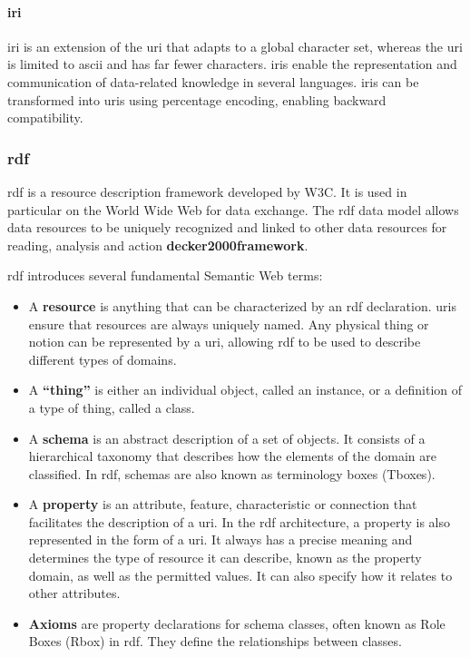         
        \paragraph{\acrfull{iri}}
        \acrshort{iri} is an extension of the \acrshort{uri} that adapts to a global character set, whereas the \acrshort{uri} is limited to \acrshort{ascii} and has far fewer characters. \acrshort{iri}s enable the representation and communication of data-related knowledge in several languages. \acrshort{iri}s can be transformed into \acrshort{uri}s using percentage encoding, enabling backward compatibility.


    \subsubsection{\acrfull{rdf}}
    \acrshort{rdf} is a resource description framework developed by W3C. It is used in particular on the World Wide Web for data exchange. The \acrshort{rdf} data model allows data resources to be uniquely recognized and linked to other data resources for reading, analysis and action \textbf{decker2000framework}. 

    \acrshort{rdf} introduces several fundamental Semantic Web terms:

    \begin{itemize}
        \item A \textbf{resource} is anything that can be characterized by an \acrshort{rdf} declaration. \acrshort{uri}s ensure that resources are always uniquely named. Any physical thing or notion can be represented by a \acrshort{uri}, allowing \acrshort{rdf} to be used to describe different types of domains.
        \item A \textbf{“thing”} is either an individual object, called an instance, or a definition of a type of thing, called a class. 
        \item A \textbf{schema} is an abstract description of a set of objects. It consists of a hierarchical taxonomy that describes how the elements of the domain are classified. In \acrshort{rdf}, schemas are also known as terminology boxes (Tboxes). 
        \item A \textbf{property} is an attribute, feature, characteristic or connection that facilitates the description of a \acrshort{uri}. In the \acrshort{rdf} architecture, a property is also represented in the form of a \acrshort{uri}. It always has a precise meaning and determines the type of resource it can describe, known as the property domain, as well as the permitted values. It can also specify how it relates to other attributes. 
        \item \textbf{Axioms} are property declarations for schema classes, often known as Role Boxes (Rbox) in \acrshort{rdf}. They define the relationships between classes.
    \end{itemize}

